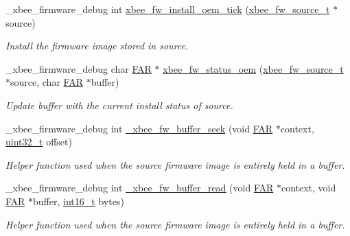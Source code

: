 \begin{DoxyCompactItemize}
\item 
\-\_\-xbee\-\_\-firmware\-\_\-debug int \hyperlink{group__xbee__firmware_gaea52642560ef68878fbca44e81df2be8}{xbee\-\_\-fw\-\_\-install\-\_\-oem\-\_\-tick} (\hyperlink{structxbee__fw__source__t}{xbee\-\_\-fw\-\_\-source\-\_\-t} $\ast$source)
\begin{DoxyCompactList}\small\item\em Install the firmware image stored in {\itshape source}. \end{DoxyCompactList}\item 
\-\_\-xbee\-\_\-firmware\-\_\-debug char \hyperlink{group__hal_gaef060b3456fdcc093a7210a762d5f2ed}{F\-A\-R} $\ast$ \hyperlink{group__xbee__firmware_ga0198db687345929eece03335ea1c7701}{xbee\-\_\-fw\-\_\-status\-\_\-oem} (\hyperlink{structxbee__fw__source__t}{xbee\-\_\-fw\-\_\-source\-\_\-t} $\ast$source, char \hyperlink{group__hal_gaef060b3456fdcc093a7210a762d5f2ed}{F\-A\-R} $\ast$buffer)
\begin{DoxyCompactList}\small\item\em Update {\itshape buffer} with the current install status of {\itshape source}. \end{DoxyCompactList}\item 
\-\_\-xbee\-\_\-firmware\-\_\-debug int \hyperlink{group__xbee__firmware_ga86a474f683ca3239ddea7b6414a6c555}{\-\_\-xbee\-\_\-fw\-\_\-buffer\-\_\-seek} (void \hyperlink{group__hal_gaef060b3456fdcc093a7210a762d5f2ed}{F\-A\-R} $\ast$context, \hyperlink{group__hal__dos_ga09a1e304d66d35dd47daffee9731edaa}{uint32\-\_\-t} offset)
\begin{DoxyCompactList}\small\item\em Helper function used when the source firmware image is entirely held in a buffer. \end{DoxyCompactList}\item 
\-\_\-xbee\-\_\-firmware\-\_\-debug int \hyperlink{group__xbee__firmware_ga3e528e574ae73a5f8bbc8b2783f04c4f}{\-\_\-xbee\-\_\-fw\-\_\-buffer\-\_\-read} (void \hyperlink{group__hal_gaef060b3456fdcc093a7210a762d5f2ed}{F\-A\-R} $\ast$context, void \hyperlink{group__hal_gaef060b3456fdcc093a7210a762d5f2ed}{F\-A\-R} $\ast$buffer, \hyperlink{group__hal_ga2140805d08462d474b82ddc8d1c2f3e6}{int16\-\_\-t} bytes)
\begin{DoxyCompactList}\small\item\em Helper function used when the source firmware image is entirely held in a buffer. \end{DoxyCompactList}\item 

\end{DoxyCompactItemize}
